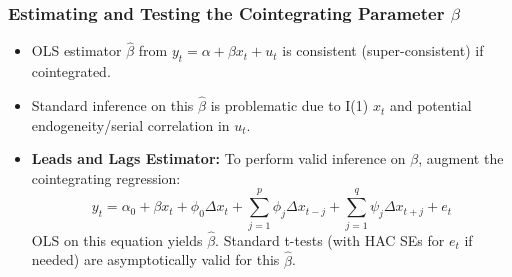 \documentclass[a4paper, 10pt]{article}
\theoremstyle{definition}	%
\begin{document}
\subsubsection{Estimating and Testing the Cointegrating Parameter \(\beta\)}
\begin{itemize}
    \item OLS estimator \(\hat{\beta}\) from \(y_t = \alpha + \beta x_t + u_t\) is consistent (super-consistent) if cointegrated.
    \item Standard inference on this \(\hat{\beta}\) is problematic due to I(1) \(x_t\) and potential endogeneity/serial correlation in \(u_t\).
    \item \textbf{Leads and Lags Estimator:} To perform valid inference on \(\beta\), augment the cointegrating regression:
    \[ y_t = \alpha_0 + \beta x_t + \phi_0 \Delta x_t + \sum_{j=1}^p \phi_j \Delta x_{t-j} + \sum_{j=1}^q \psi_j \Delta x_{t+j} + e_t \]
    OLS on this equation yields \(\hat{\beta}\). Standard t-tests (with HAC SEs for \(e_t\) if needed) are asymptotically valid for this \(\hat{\beta}\).
\end{itemize}
\end{document}
